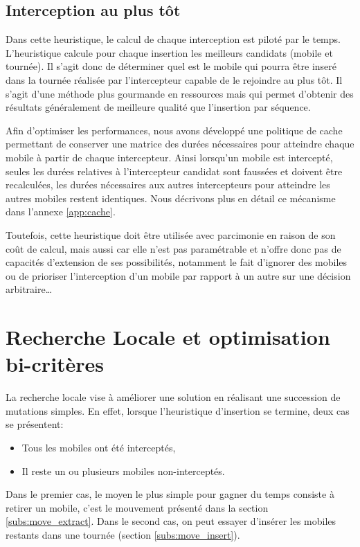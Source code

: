 		\subsection{Interception au plus tôt}
		\label{sub:heuristic_fastest}
			Dans cette heuristique, le calcul de chaque interception est piloté par le temps. L'heuristique calcule pour chaque insertion les meilleurs candidats (mobile et tournée). Il s'agit donc de déterminer quel est le mobile qui pourra être inseré dans la tournée réalisée par l'intercepteur capable de le rejoindre au plus tôt. Il s'agit d'une méthode plus gourmande en ressources mais qui permet d'obtenir des résultats généralement de meilleure qualité que l'insertion par séquence.

			Afin d'optimiser les performances, nous avons développé une politique de \gls{cache} permettant de conserver une matrice des durées nécessaires pour atteindre chaque mobile à partir de chaque intercepteur. Ainsi lorsqu'un mobile est intercepté, seules les durées relatives à l'intercepteur candidat sont faussées et doivent être recalculées, les durées nécessaires aux autres intercepteurs pour atteindre les autres mobiles restent identiques. Nous décrivons plus en détail ce mécanisme dans l'annexe \ref{app:cache}.

			Toutefois, cette heuristique doit être utilisée avec parcimonie en raison de son coût de calcul, mais aussi car elle n'est pas paramétrable et n'offre donc pas de capacités d'extension de ses possibilités, notamment le fait d'ignorer des mobiles ou de prioriser l'interception d'un mobile par rapport à un autre sur une décision arbitraire\ldots

    \section{Recherche Locale et optimisation bi-critères}
		La recherche locale vise à améliorer une solution en réalisant une succession de mutations simples. En effet, lorsque l'heuristique d'insertion se termine, deux cas se présentent:
		\begin{itemize}
			\item Tous les mobiles ont été interceptés,
			\item Il reste un ou plusieurs mobiles non-interceptés.
		\end{itemize}

		Dans le premier cas, le moyen le plus simple pour gagner du temps consiste à retirer un mobile, c'est le mouvement présenté dans la section \ref{subs:move_extract}. Dans le second cas, on peut essayer d'insérer les mobiles restants dans une tournée (section \ref{subs:move_insert}).

